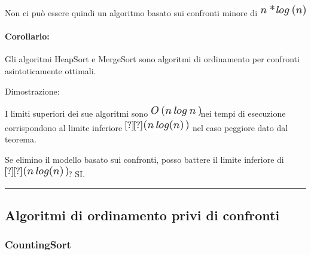 \documentclass{article}
\let\oldparagraph\paragraph
\renewcommand{\paragraph}[1]{\oldparagraph{#1}\mbox{}}
\begin{document}
{Non ci può essere quindi un algoritmo basato sui confronti minore di }\includegraphics{images/image180.png}

\hypertarget{h.emyylm3q4aq8}{\paragraph{\texorpdfstring{{Corollario:}}{Corollario:}}\label{h.emyylm3q4aq8}}

{Gli algoritmi HeapSort e MergeSort sono algoritmi di ordinamento per confronti asintoticamente ottimali.}

{Dimostrazione:}

{I limiti superiori dei sue algoritmi sono }\includegraphics{images/image181.png}{nei tempi di esecuzione
corrispondono al limite inferiore }\includegraphics{images/image153.png}{~nel caso peggiore dato dal
teorema.}

{Se elimino il modello basato sui confronti, posso battere il limite
inferiore di }\includegraphics{images/image153.png}{? SI.}

\begin{center}\rule{0.5\linewidth}{\linethickness}\end{center}

\subsection{\texorpdfstring{{}}{}}\label{h.9sera6op4yxc}

\hypertarget{h.p17586cst16}{\subsection{\texorpdfstring{{Algoritmi di
ordinamento privi di
confronti}}{Algoritmi di ordinamento privi di confronti}}\label{h.p17586cst16}}

\hypertarget{h.bfk18jaq5ar4}{\subsubsection{\texorpdfstring{{CountingSort}}{CountingSort}}\label{h.bfk18jaq5ar4}}
\end{document}
